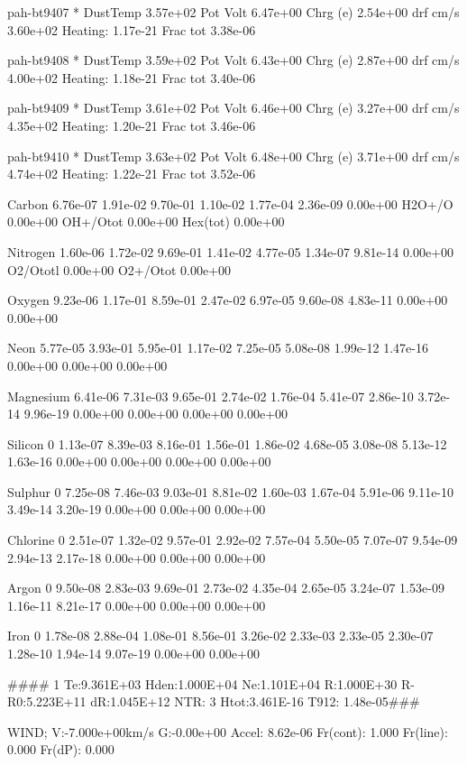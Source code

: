 { pah-bt9407 *  DustTemp 3.57e+02 Pot Volt 6.47e+00 Chrg (e) 2.54e+00 drf
cm/s 3.60e+02 Heating: 1.17e-21 Frac tot 3.38e-06

 pah-bt9408 *  DustTemp 3.59e+02 Pot Volt 6.43e+00 Chrg (e) 2.87e+00 drf
cm/s 4.00e+02 Heating: 1.18e-21 Frac tot 3.40e-06

 pah-bt9409 *  DustTemp 3.61e+02 Pot Volt 6.46e+00 Chrg (e) 3.27e+00 drf
cm/s 4.35e+02 Heating: 1.20e-21 Frac tot 3.46e-06

 pah-bt9410 *  DustTemp 3.63e+02 Pot Volt 6.48e+00 Chrg (e) 3.71e+00 drf
cm/s 4.74e+02 Heating: 1.22e-21 Frac tot 3.52e-06

 Carbon        6.76e-07 1.91e-02 9.70e-01 1.10e-02 1.77e-04 2.36e-09 0.00e+00
H2O+/O   0.00e+00 OH+/Otot 0.00e+00 Hex(tot) 0.00e+00

 Nitrogen      1.60e-06 1.72e-02 9.69e-01 1.41e-02 4.77e-05 1.34e-07 9.81e-14
0.00e+00 O2/Ototl 0.00e+00 O2+/Otot 0.00e+00

 Oxygen        9.23e-06 1.17e-01 8.59e-01 2.47e-02 6.97e-05 9.60e-08 4.83e-11
0.00e+00 0.00e+00

 Neon          5.77e-05 3.93e-01 5.95e-01 1.17e-02 7.25e-05 5.08e-08 1.99e-12
1.47e-16 0.00e+00 0.00e+00 0.00e+00

 Magnesium     6.41e-06 7.31e-03 9.65e-01 2.74e-02 1.76e-04 5.41e-07 2.86e-10
3.72e-14 9.96e-19 0.00e+00 0.00e+00 0.00e+00 0.00e+00

 Silicon    0  1.13e-07 8.39e-03 8.16e-01 1.56e-01 1.86e-02 4.68e-05 3.08e-08
5.13e-12 1.63e-16 0.00e+00 0.00e+00 0.00e+00 0.00e+00

 Sulphur    0  7.25e-08 7.46e-03 9.03e-01 8.81e-02 1.60e-03 1.67e-04 5.91e-06
9.11e-10 3.49e-14 3.20e-19 0.00e+00 0.00e+00 0.00e+00

 Chlorine   0  2.51e-07 1.32e-02 9.57e-01 2.92e-02 7.57e-04 5.50e-05 7.07e-07
9.54e-09 2.94e-13 2.17e-18 0.00e+00 0.00e+00 0.00e+00

 Argon      0  9.50e-08 2.83e-03 9.69e-01 2.73e-02 4.35e-04 2.65e-05 3.24e-07
1.53e-09 1.16e-11 8.21e-17 0.00e+00 0.00e+00 0.00e+00

 Iron       0  1.78e-08 2.88e-04 1.08e-01 8.56e-01 3.26e-02 2.33e-03 2.33e-05
2.30e-07 1.28e-10 1.94e-14 9.07e-19 0.00e+00 0.00e+00


\#\#\#\#  1  Te:9.361E+03 Hden:1.000E+04 Ne:1.101E+04 R:1.000E+30
R-R0:5.223E+11 dR:1.045E+12 NTR:  3 Htot:3.461E-16 T912: 1.48e-05\#\#\#


WIND; V:-7.000e+00km/s G:-0.00e+00 Accel: 8.62e-06 Fr(cont): 1.000 Fr(line):
0.000 Fr(dP): 0.000


}
